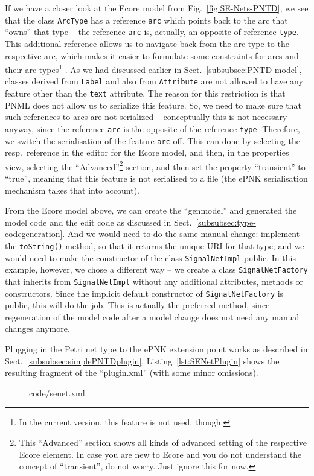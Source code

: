 If we have a closer look at the Ecore model from Fig.~\ref{fig:SE-Nets-PNTD},
we see that the class {\tt ArcType} has a reference {\tt arc} which points
back to the arc that ``owns'' that type -- the reference {\tt arc} is, actually,
an opposite of reference {\tt type}. This additional reference allows us to
navigate back from the arc type to the respective arc, which makes it easier
to formulate some constraints for arcs and their arc types\footnote
  {In the current version, this feature is not used, though.}%
. As we had discussed earlier in Sect.~\ref{subsubsec:PNTD-model}, classes
derived from {\tt Label} and also from {\tt Attribute} are not allowed to
have any feature other than the {\tt text} attribute. The reason for this
restriction is that PNML does not allow us to serialize this feature.
So, we need to make sure that such references to arcs are not serialized --
conceptually this is not necessary anyway, since the reference {\tt arc} is the opposite
of the reference {\tt type}. Therefore, we switch the serialisation
of the feature {\tt arc} off. This can done by selecting the resp.\ reference
in the editor for the Ecore model, and then, in the properties view, 
selecting the ``Advanced''\footnote
  {This ``Advanced'' section shows all kinds of advanced setting of the
   respective Ecore element. In case you are new to Ecore and you do not
   understand the concept of ``transient'', do not worry. Just ignore this for
   now.}
section, and then set the property ``transient'' to ``true'', meaning that this
feature is not serialised to a file (the ePNK serialisation mechanism takes that
into account).%

From the Ecore model above, we can create the ``genmodel'' and generated the
model code and the edit code as discussed in Sect.~\ref{subsubsec:type-codegeneration}.
And we would need to do the same manual change: implement the {\tt toString()} method,
so that it returns the unique URI for that type; and we would need to make the
constructor of the class {\tt SignalNetImpl} public. In this example, however, we chose a
different way -- we create a class {\tt SignalNetFactory} that inherits from
{\tt SignalNetImpl} without any additional attributes, methods or constructors.
Since the implicit default constructor of {\tt SignalNetFactory} is public,
this will do the job. This is actually the preferred method, since regeneration
of the model code after a model change does not need any manual changes anymore.

Plugging in the Petri net type to the ePNK extension point works as described
in Sect.~\ref{subsubsec:simplePNTDplugin}. Listing~\ref{lst:SENetPlugin} shows
the resulting fragment of the ``plugin.xml'' (with some minor omissions).
%
\begin{figure}[htbp!]
%
  {code/senet.xml}
\end{figure}

